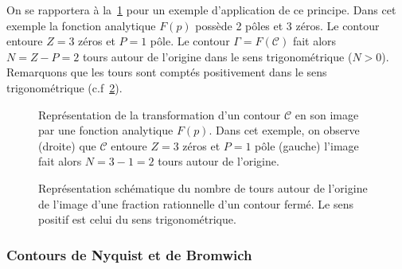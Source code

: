 On se rapportera à la~\cref{fig-contour_cauchy} pour un exemple d'application 
de ce principe. Dans cet exemple la fonction analytique $F(p)$ possède 2 pôles 
et 3 zéros. Le contour entoure $Z=3$ zéros et $P=1$ pôle.
Le contour $\Gamma=F(\mathcal{C})$ fait alors $N=Z-P=2$ tours autour 
de l'origine dans le sens trigonométrique ($N>0$). Remarquons que les tours 
sont comptés positivement dans le sens trigonométrique (c.f~\cref{fig-ntours}).

\begin{figure}[!h]
    \centering
    
    \caption{Représentation de la transformation d'un contour $\mathcal{C}$ 
             en son image par une fonction analytique $F(p)$. Dans cet exemple,
             on observe (droite) que $\mathcal{C}$ entoure $Z=3$ zéros et 
             $P=1$ pôle (gauche) l'image fait alors $N=3-1=2$ tours autour de 
             l'origine.
    \label{fig-contour_cauchy}}
\end{figure}


\begin{figure}[!h]
    \centering
    
    
    

    
    
    
    \caption{Représentation schématique du nombre de tours autour de 
             l'origine de l'image d'une fraction rationnelle d'un contour 
             fermé. Le sens positif est celui du sens trigonométrique.
             \label{fig-ntours}}
\end{figure}

\clearpage
\subsubsection{Contours de Nyquist et de Bromwich}

